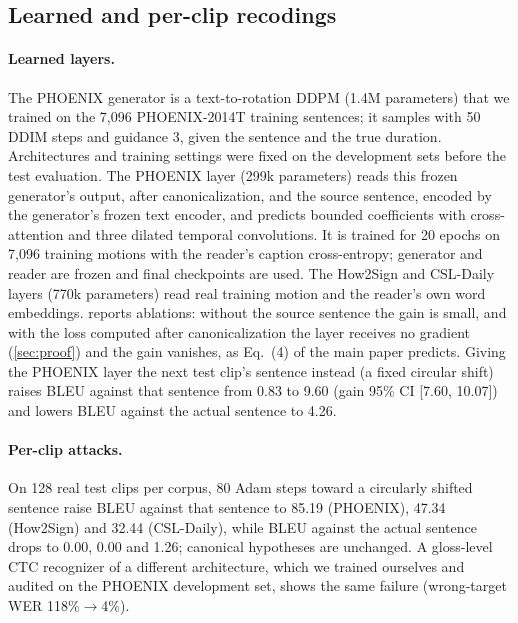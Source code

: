 \documentclass[10pt,twocolumn,letterpaper]{article}
\begin{document}
\subsection{Learned and per-clip recodings}
\paragraph{Learned layers.} The PHOENIX generator is a text-to-rotation DDPM (1.4M parameters) that we trained on the 7,096 PHOENIX-2014T training sentences; it samples with 50 DDIM steps and guidance 3, given the sentence and the true duration. Architectures and training settings were fixed on the development sets before the test evaluation. The PHOENIX layer (299k parameters) reads this frozen generator's output, after canonicalization, and the source sentence, encoded by the generator's frozen text encoder, and predicts bounded coefficients with cross-attention and three dilated temporal convolutions. It is trained for 20 epochs on 7,096 training motions with the reader's caption cross-entropy; generator and reader are frozen and final checkpoints are used. The How2Sign and CSL-Daily layers (770k parameters) read real training motion and the reader's own word embeddings.  reports ablations: without the source sentence the gain is small, and with the loss computed after canonicalization the layer receives no gradient (\cref{sec:proof}) and the gain vanishes, as Eq.~(4) of the main paper predicts. Giving the PHOENIX layer the next test clip's sentence instead (a fixed circular shift) raises BLEU against that sentence from 0.83 to 9.60 (gain 95\% CI [7.60, 10.07]) and lowers BLEU against the actual sentence to 4.26.



\paragraph{Per-clip attacks.} On 128 real test clips per corpus, 80 Adam steps toward a circularly shifted sentence raise BLEU against that sentence to 85.19 (PHOENIX), 47.34 (How2Sign) and 32.44 (CSL-Daily), while BLEU against the actual sentence drops to 0.00, 0.00 and 1.26; canonical hypotheses are unchanged. A gloss-level CTC recognizer of a different architecture, which we trained ourselves and audited on the PHOENIX development set, shows the same failure (wrong-target WER 118\%$\to$4\%).
\end{document}

